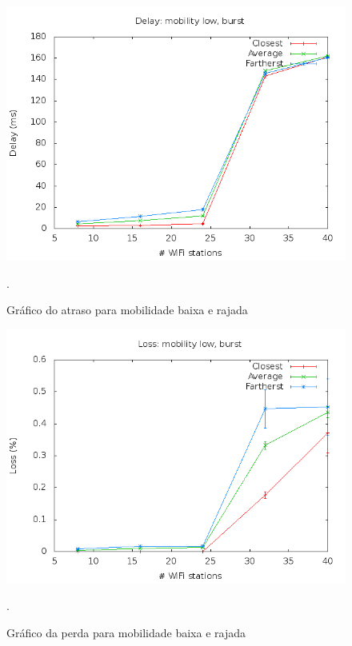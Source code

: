 \documentclass[12pt,twoside,a4paper]{article}
\begin{document}
\begin{figure}[H]
\centering
\includegraphics[scale=0.5]{mo818-delay-mob-0-traf-1}
\caption{Gráfico do atraso para mobilidade baixa e rajada}.
\label{fig:atraso-m0-t1}
\end{figure}

\begin{figure}[H]
\centering
\includegraphics[scale=0.5]{mo818-loss-mob-0-traf-1}
\caption{Gráfico da perda para mobilidade baixa e rajada}.
\label{fig:perda-m0-t1}
\end{figure}
\end{document}
